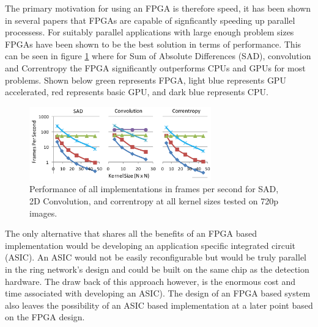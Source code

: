 The primary motivation for using an FPGA is therefore speed, it has been shown in several papers that FPGAs are capable of signficantly speeding up parallel processess\cite{Fowers:2012:PEC:2145694.2145704}. For suitably parallel applications with large enough problem sizes FPGAs have been shown to be the best solution in terms of performance. This can be seen in figure \ref{fig:cpugpufpga} where for Sum of Absolute Differences (SAD), convolution and Correntropy the FPGA significantly outperforms CPUs and GPUs for most problems\cite{Fowers:2012:PEC:2145694.2145704}. Shown below green represents FPGA, light blue represents GPU accelerated, red represents basic GPU, and dark blue represents CPU.

\begin{figure}[h]
  \centering
  \includegraphics[width=0.7\textwidth]{./figs/cpugpufpga.png}
  \caption{Performance of all implementations in frames per 
second for SAD, 2D Convolution, and correntropy at all kernel 
sizes tested on 720p images. \cite{Fowers:2012:PEC:2145694.2145704}}
  \label{fig:cpugpufpga}
\end{figure}


The only alternative that shares all the benefits of an FPGA  based implementation would be developing an application specific integrated circuit (ASIC). An ASIC would not be easily reconfigurable but would be truly parallel in the ring network's design and could be built on the same chip as the detection hardware. The draw back of this approach however, is the enormous cost and time associated with developing an ASIC).  The design of an FPGA based system also leaves the possibility of an ASIC based implementation at a later point based on the FPGA design.
\vspace*{\fill}


